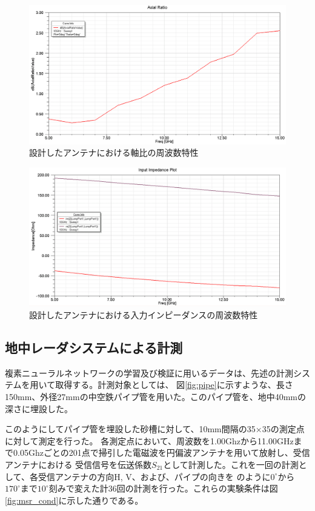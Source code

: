 \documentclass[11pt,a4paper,uplatex,draft]{ujarticle}
\begin{document}
  \begin{figure}[hbtp]
    \centering
    \includegraphics[keepaspectratio, width=130mm]{Images/axial_ratio.png}
    \caption{設計したアンテナにおける軸比の周波数特性}
    \label{fig:axial_ratio}
  \end{figure}

  \begin{figure}[hbtp]
    \centering
    \includegraphics[keepaspectratio, width=130mm]{Images/spiral_impedance.png}
    \caption{設計したアンテナにおける入力インピーダンスの周波数特性}
    \label{fig:spiral_antenna_impedance}
  \end{figure}

\newpage

  \subsection{地中レーダシステムによる計測}
  複素ニューラルネットワークの学習及び検証に用いるデータは、先述の計測システムを用いて取得する。計測対象としては、
  図\ref{fig:pipe}に示すような、長さ150mm、外径27mmの中空鉄パイプ管を用いた。このパイプ管を、地中40mmの深さに埋設した。

  このようにしてパイプ管を埋設した砂槽に対して、10mm間隔の35×35の測定点に対して測定を行った。
  各測定点において、周波数を1.00Ghzから11.00GHzまで0.05Ghzごとの201点で掃引した電磁波を円偏波アンテナを用いて放射し、受信アンテナにおける
  受信信号を伝送係数$S_{21}$として計測した。これを一回の計測として、各受信アンテナの方向H, V、および、パイプの向きを
  のように$0^{\circ}$から$170^{\circ}$まで$10^{\circ}$刻みで変えた計36回の計測を行った。これらの実験条件は図\ref{fig:msr_cond}に示した通りである。
\end{document}
